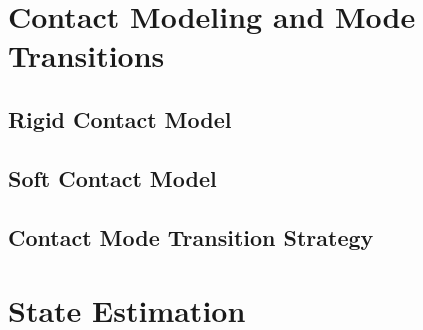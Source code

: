 \begin{criticalinsight}
\end{criticalinsight}

\section{Contact Modeling and Mode Transitions}
\label{sec:contact-modeling}


\subsection{Rigid Contact Model}
\lipsum[20]

\subsection{Soft Contact Model}
\lipsum[21]

\subsection{Contact Mode Transition Strategy}
\lipsum[22]

\begin{criticalinsight}
\end{criticalinsight}

\section{State Estimation}
\label{sec:state-estimation}


\lipsum[23]

\begin{criticalinsight}
\end{criticalinsight}

